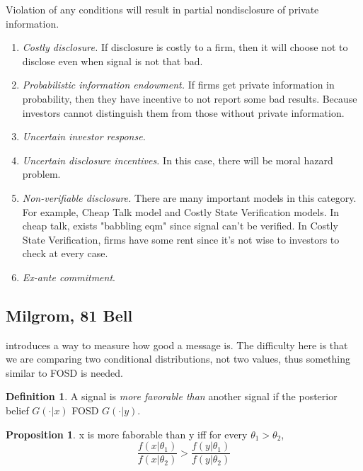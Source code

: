 \documentclass{book}
\theoremstyle{plain}
\theoremstyle{definition}
\newtheorem{defn}{Definition}[section] %
\newtheorem{prop}[thm]{Proposition}
\begin{document}
Violation of any conditions will result in partial nondisclosure of private information.
\begin{enumerate}
	\setlength{\itemsep}{0pt}
	\item \textit{Costly disclosure.} If disclosure is costly to a firm, then it will choose not to disclose even when signal is not that bad.
	\item \textit{Probabilistic information endowment.} If firms get private information in probability, then they have incentive to not report some bad results. Because investors cannot distinguish them from those without private information.
	\item \textit{Uncertain investor response.}
	\item \textit{Uncertain disclosure incentives.} In this case, there will be moral hazard problem.
	\item \textit{Non-verifiable disclosure.} There are many important models in this category. For example, Cheap Talk model and Costly State Verification models. In cheap talk, exists "babbling eqm" since signal can't be verified. In Costly State Verification, firms have some rent since it's not wise to investors to check at every case.
	\item \textit{Ex-ante commitment}.
\end{enumerate}




\subsection{Milgrom, 81 Bell} %
\label{sub:milgrom_81_bell}

\textbf{}

\cite{Milgrom:1981dv} introduces a way to measure how good a message is. The difficulty here is that we are comparing two conditional distributions, not two values, thus something similar to FOSD is needed.

\begin{defn}
A signal is \textit{more favorable than} another signal if the posterior belief $G(\cdot|x)$ FOSD $G(\cdot|y)$.
\end{defn}

\begin{prop}
x is more faborable than y iff for every $\theta_1>\theta_2$,
\begin{equation}
\label{eq:milgrom81_2a}
\frac{f(x|\theta_1)}{f(x|\theta_2)}>\frac{f(y|\theta_1)}{f(y|\theta_2)}
\end{equation}
\end{prop}
\end{document}
